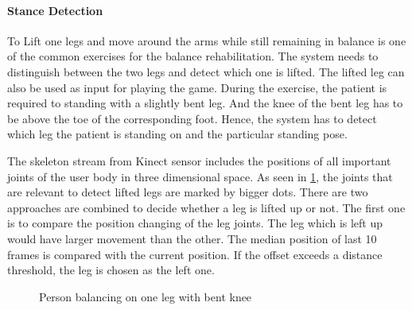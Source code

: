 \paragraph{Stance Detection}
To Lift one legs and move around the arms while still remaining in balance is one of the common exercises for the balance rehabilitation. The system needs to distinguish between the two legs and detect which one is lifted. The lifted leg can also be used as input for playing the game. During the exercise, the patient is required to standing with a slightly bent leg. And the knee of the bent leg has to be above the toe of the corresponding foot. Hence, the system has to detect which leg the patient is standing on and the particular standing pose. 

The skeleton stream from Kinect sensor includes the positions of all important joints of the user body in three dimensional space. As seen in \figurename{\ref{fig:3-IMR:rehabilitationstance}}, the joints that are relevant to detect lifted legs are marked by bigger dots. There are two approaches are combined to decide whether a leg is lifted up or not. The first one is to compare the position changing of the leg joints. The leg which is left up would have larger movement than the other. The median position of last 10 frames is compared with the current position. If the offset exceeds a distance threshold, the leg is chosen as the left one.
\begin{figure}
	\centering
	\caption{Person balancing on one leg with bent knee}
	\label{fig:3-IMR:rehabilitationstance}
\end{figure}

